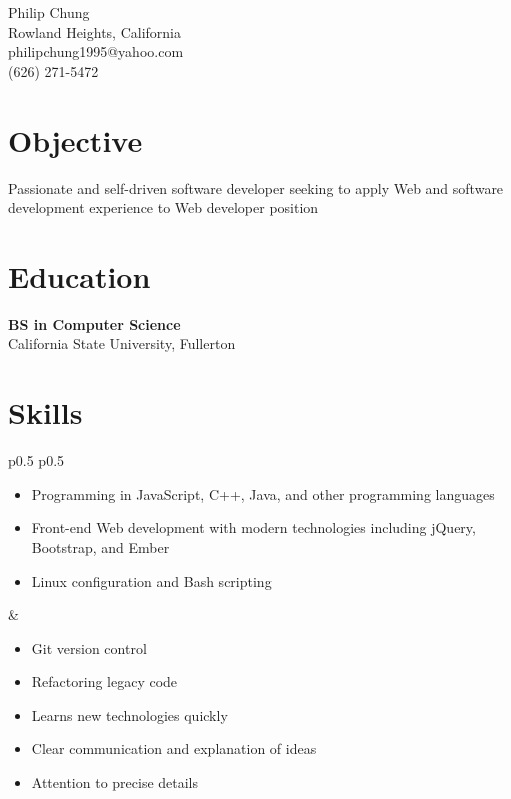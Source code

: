 \documentclass[10pt]{article}
\newcommand{\baseheader}[3]{#1 \marginpar{\raggedleft #2} \\ #3}
\begin{document}
	\begin{center}
		{\LARGE Philip Chung} \\
		Rowland Heights, California \\
		philipchung1995@yahoo.com \\
		(626) 271-5472 \\
	\end{center}

	\section*{Objective}

	Passionate and self-driven software developer seeking to apply Web and software development experience to Web developer position

	\section*{Education}

	\baseheader{\textbf{BS in Computer Science}}{1/2018}{California State University, Fullerton}

	\section*{Skills}

	\begin{tabular}{p{0.5\textwidth} p{0.5\textwidth}}
		\begin{minipage}[t]{\linewidth}
			\raggedright
			\begin{itemize}[nosep]
				\item Programming in JavaScript, C++, Java, and other programming languages
				\item Front-end Web development with modern technologies including jQuery, Bootstrap, and Ember
				\item Linux configuration and Bash scripting
			\end{itemize}
		\end{minipage}
		&
		\begin{minipage}[t]{\linewidth}
			\raggedright
			\begin{itemize}[nosep]
				\item Git version control
				\item Refactoring legacy code
				\item Learns new technologies quickly
				\item Clear communication and explanation of ideas
				\item Attention to precise details
			\end{itemize}
		\end{minipage}
	\end{tabular}
\end{document}
